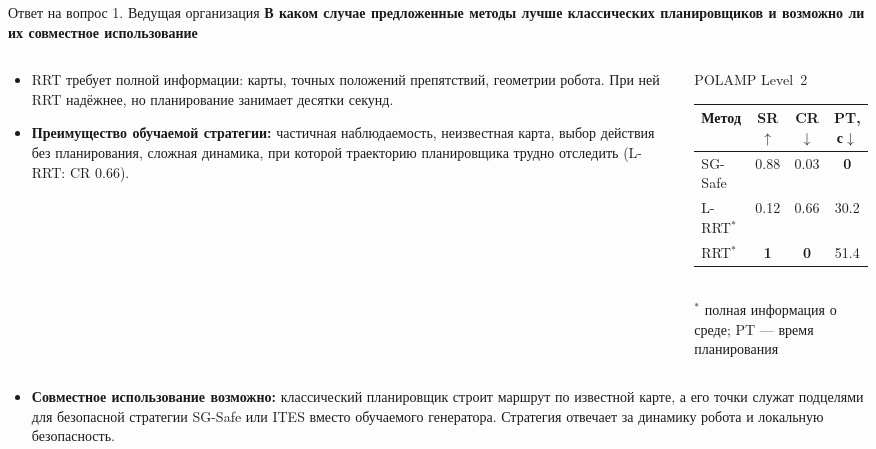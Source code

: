 \begin{frame}[noframenumbering,shrink=5]{Ответ на вопрос 1. Ведущая организация}
    \small
    \textbf{В каком случае предложенные методы лучше классических
    планировщиков и возможно ли их совместное использование}

    \vspace{0.4em}
    \begin{columns}[T,onlytextwidth]
        \begin{column}{0.58\textwidth}
            \begin{itemize}
                \item RRT требует полной информации: карты, точных положений
                      препятствий, геометрии робота. При ней RRT надёжнее, но
                      планирование занимает десятки секунд.
                \item \textbf{Преимущество обучаемой стратегии:} частичная
                      наблюдаемость, неизвестная карта, выбор действия без
                      планирования, сложная динамика, при которой траекторию
                      планировщика трудно отследить (L-RRT: CR $0.66$).
            \end{itemize}
        \end{column}
        \begin{column}{0.4\textwidth}
            \centering
            \scriptsize
            POLAMP Level~2\\[0.3em]
            \begin{tabular}{lccc}
                \toprule
                Метод & SR$\uparrow$ & CR$\downarrow$ & PT, с$\downarrow$ \\
                \midrule
                SG-Safe & 0.88 & 0.03 & \textbf{0} \\
                L-RRT$^{*}$ & 0.12 & 0.66 & 30.2 \\
                RRT$^{*}$ & \textbf{1} & \textbf{0} & 51.4 \\
                \bottomrule
            \end{tabular}\\[0.3em]
            {\tiny $^{*}$ полная информация о среде; PT --- время
            планирования}
        \end{column}
    \end{columns}
    \begin{itemize}
        \item \textbf{Совместное использование возможно:} классический
              планировщик строит маршрут по известной карте, а его точки
              служат подцелями для безопасной стратегии SG-Safe или ITES
              вместо обучаемого генератора. Стратегия отвечает за динамику
              робота и локальную безопасность.
    \end{itemize}
\end{frame}

